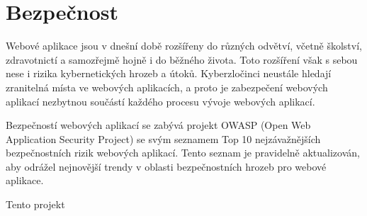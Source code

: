 \chapter{Bezpečnost}
Webové aplikace jsou v dnešní době rozšířeny do různých odvětví, včetně školství, zdravotnictí a samozřejmě hojně i do běžného života. Toto rozšíření však s sebou nese i rizika kybernetických hrozeb a útoků. Kyberzločinci neustále hledají zranitelná místa ve webových aplikacích, a proto je zabezpečení webových aplikací nezbytnou součástí každého procesu vývoje webových aplikací. \par
Bezpečností webových aplikací se zabývá projekt OWASP (Open Web Application Security Project) se svým seznamem Top 10 nejzávažnějších bezpečnostních rizik webových aplikací. Tento seznam je pravidelně aktualizován, aby odrážel nejnovější trendy v oblasti bezpečnostních hrozeb pro webové aplikace.\par
Tento projekt